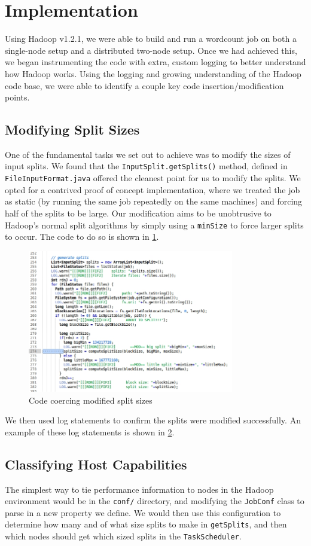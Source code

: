 \section{Implementation}
\label{section:implementation}
Using Hadoop v1.2.1, we were able to build and run a wordcount job
on both a single-node setup and a distributed two-node setup. Once
we had achieved this, we began instrumenting the code with extra,
custom logging to better understand how Hadoop works. Using the
logging and growing understanding of the Hadoop code base, we were
able to identify a couple key code insertion/modification points.

\subsection{Modifying Split Sizes}
One of the fundamental tasks we set out to achieve was to modify the
sizes of input splits. We found that the \texttt{InputSplit.getSplits()}
method, defined in \texttt{FileInputFormat.java} offered the cleanest
point for us to modify the splits. We opted for a contrived proof of
concept implementation, where we treated the job as static (by running
the same job repeatedly on the same machines) and forcing half of the
splits to be large. Our modification aims to be unobtrusive to Hadoop's
normal split algorithms by simply using a \texttt{minSize} to force larger
splits to occur. The code to do so is shown in \ref{fig:getSplitsCode}.

\begin{figure}[ht!]
\centering
\includegraphics[width=90mm]{getSplitsCode.jpg}
\caption{Code coercing modified split sizes}
\label{fig:getSplitsCode}
\end{figure}

We then used log statements to confirm the splits were modified successfully.
An example of these log statements is shown in \ref{fig:getSplitsLog}.

\begin{figure}[ht!]
\label{fig:getSplitsLog}
\end{figure}

\subsection{Classifying Host Capabilities}
The simplest way to tie performance information to nodes in the Hadoop
environment would be in the \texttt{conf/} directory, and modifying the
\texttt{JobConf} class to parse in a new property we define. We would then
use this configuration to determine how many and of what size splits to make
in \texttt{getSplits}, and then which nodes should get which sized splits
in the \texttt{TaskScheduler}.